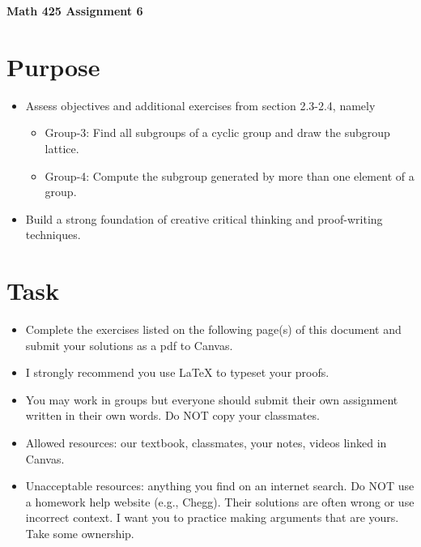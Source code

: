 \documentclass[12pt]{article}
\begin{document}
	\begin{center}
		{\Large \bf Math 425 Assignment 6}
	\end{center}
	\section*{Purpose}
		\begin{itemize}
			\item Assess objectives and additional exercises from section 2.3-2.4, namely
				\begin{itemize}
					\item Group-3: Find all subgroups of a cyclic group and draw the subgroup lattice.
					\item Group-4: Compute the subgroup generated by more than one element of a group.
				\end{itemize}
			\item Build a strong foundation of creative critical thinking and proof-writing techniques.
		\end{itemize}
	\section*{Task}
		\begin{itemize}
			\item Complete the exercises listed on the following page(s) of this document and submit your solutions as a pdf to Canvas.
			\item I strongly recommend you use LaTeX to typeset your proofs.
			\item You may work in groups but everyone should submit their own assignment written in their own words.  Do NOT copy your classmates.
			\item Allowed resources: our textbook, classmates, your notes, videos linked in Canvas.
			\item Unacceptable resources: anything you find on an internet search. Do NOT use a homework help website (e.g., Chegg). Their solutions are often wrong or use incorrect context.  I want you to practice making arguments that are yours. Take some ownership.
		\end{itemize}
\end{document}
